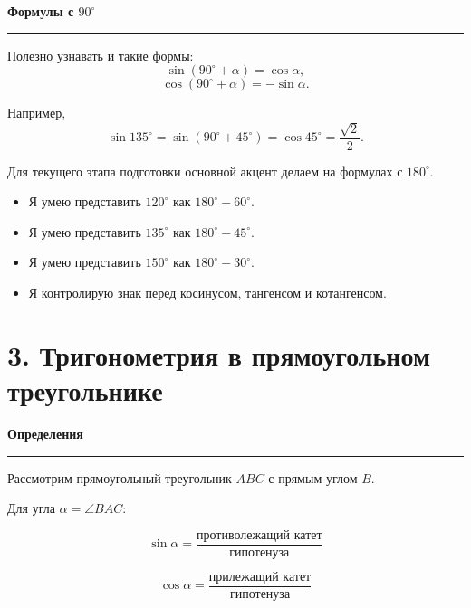 \documentclass[a4paper,12pt]{article}
\newcommand{\checkitem}{\item[$\square$]}
\newcommand{\accentline}{%
    \vspace{0.2em}
    {\color{accent}\rule{\linewidth}{0.6pt}}
    \vspace{0.5em}
}
\newcommand{\topic}[1]{%
    \vspace{0.5em}
    {\large\bfseries\color{darkaccent}#1}\par
    \accentline
}
\begin{document}
\topic{Формулы с $90^\circ$}

Полезно узнавать и такие формы:
\[
\sin(90^\circ+\alpha)=\cos\alpha,
\]
\[
\cos(90^\circ+\alpha)=-\sin\alpha.
\]

Например,
\[
\sin135^\circ
=
\sin(90^\circ+45^\circ)
=
\cos45^\circ
=
\frac{\sqrt2}{2}.
\]

Для текущего этапа подготовки основной акцент делаем на формулах с
$180^\circ$.

\begin{itemize}
\checkitem Я умею представить $120^\circ$ как $180^\circ-60^\circ$.
\checkitem Я умею представить $135^\circ$ как $180^\circ-45^\circ$.
\checkitem Я умею представить $150^\circ$ как $180^\circ-30^\circ$.
\checkitem Я контролирую знак перед косинусом, тангенсом и котангенсом.
\end{itemize}


\section*{\color{darkaccent}3. Тригонометрия в прямоугольном треугольнике}

\topic{Определения}

Рассмотрим прямоугольный треугольник $ABC$ с прямым углом $B$.

\begin{center}
\end{center}

Для угла $\alpha=\angle BAC$:

\[
\boxed{
\sin\alpha=
\frac{\text{противолежащий катет}}
     {\text{гипотенуза}}
}
\]

\[
\boxed{
\cos\alpha=
\frac{\text{прилежащий катет}}
     {\text{гипотенуза}}
}
\]
\end{document}
